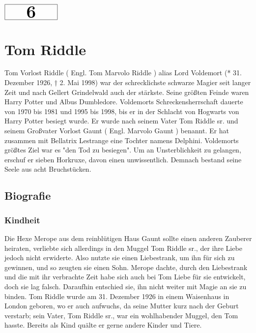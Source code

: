 \documentclass[a4paper, 10pt]{article}
\begin{document}
\begin{minipage}[t]{\textwidth}
    \vspace*{-1.5cm} %
    \begin{flushright}
        \hspace*{\fill} %
        $\boxed{\textbf{\Huge\phantom{00}6\phantom{00}}}$ %
    \end{flushright}
\end{minipage}

\section*{\huge Tom Riddle}
Tom Vorlost Riddle (  Engl.  Tom Marvolo Riddle ) alias Lord Voldemort (* 31. Dezember 1926, † 2. Mai 1998) war der schrecklichste schwarze Magier seit langer Zeit und nach Gellert Grindelwald auch der stärkste. Seine größten Feinde waren Harry Potter und Albus Dumbledore. Voldemorts Schreckensherrschaft dauerte von 1970 bis 1981 und 1995 bis 1998, bis er in der Schlacht von Hogwarts von Harry Potter besiegt wurde. Er wurde nach seinem Vater Tom Riddle sr. und seinem Großvater Vorlost Gaunt (  Engl.  Marvolo Gaunt ) benannt. Er hat zusammen mit Bellatrix Lestrange eine Tochter namens Delphini.
\vspace{10pt}
\newline
Voldemorts größtes Ziel war es "den Tod zu besiegen". Um an Unsterblichkeit zu gelangen, erschuf er sieben Horkruxe, davon einen unwissentlich. Demnach bestand seine Seele aus acht Bruchstücken.

\subsection*{\Large Biografie}
\subsubsection*{\large Kindheit}
Die Hexe Merope aus dem reinblütigen Haus Gaunt sollte einen anderen Zauberer heiraten, verliebte sich allerdings in den Muggel Tom Riddle sr., der ihre Liebe jedoch nicht erwiderte. Also nutzte sie einen Liebestrank, um ihn für sich zu gewinnen, und so zeugten sie einen Sohn. Merope dachte, durch den Liebestrank und die mit ihr verbrachte Zeit habe sich auch bei Tom Liebe für sie entwickelt, doch sie lag falsch. Daraufhin entschied sie, ihn nicht weiter mit Magie an sie zu binden. Tom Riddle wurde am 31. Dezember 1926 in einem Waisenhaus in London geboren, wo er auch aufwuchs, da seine Mutter kurz nach der Geburt verstarb; sein Vater, Tom Riddle sr., war ein wohlhabender Muggel, den Tom hasste.
\vspace{10pt}
\newline
Bereits als Kind quälte er gerne andere Kinder und Tiere.
\end{document}
